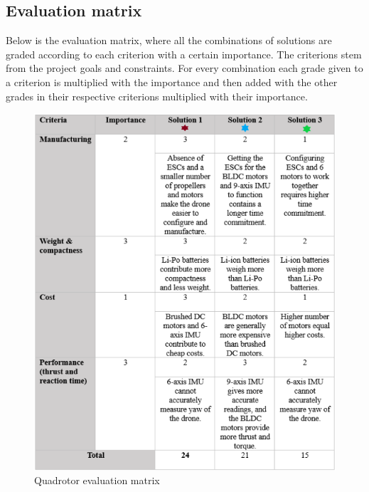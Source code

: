 \subsection{Evaluation matrix}

Below is the evaluation matrix, where all the combinations of solutions are graded according to each criterion with a certain importance. The criterions stem from the project goals and constraints. For every combination each grade given to a criterion is multiplied with the importance and then added with the other grades in their respective criterions multiplied with their importance.
\begin{figure}[H]
    \begin{center}
    \includegraphics[scale=1]{pictures/Evaluation_Matrix.png}
    \end{center}
    \caption{Quadrotor evaluation matrix}
    \label{fig:evaluation}
\end{figure}